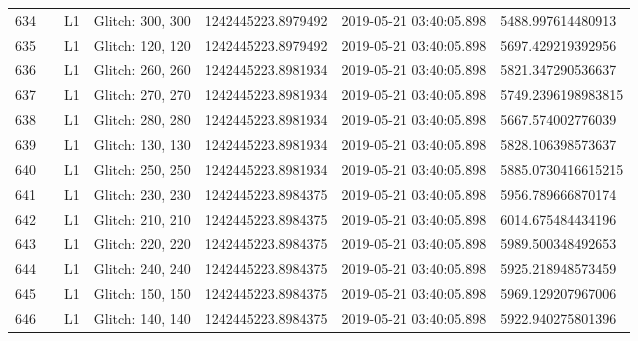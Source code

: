 \begin{longtable}{lllllll}
634  &                                                    &       L1 &  Glitch: 300, 300 &  1242445223.8979492 &  2019-05-21 03:40:05.898 &   5488.997614480913 \\
635  &                                                    &       L1 &  Glitch: 120, 120 &  1242445223.8979492 &  2019-05-21 03:40:05.898 &   5697.429219392956 \\
636  &                                                    &       L1 &  Glitch: 260, 260 &  1242445223.8981934 &  2019-05-21 03:40:05.898 &   5821.347290536637 \\
637  &                                                    &       L1 &  Glitch: 270, 270 &  1242445223.8981934 &  2019-05-21 03:40:05.898 &  5749.2396198983815 \\
638  &                                                    &       L1 &  Glitch: 280, 280 &  1242445223.8981934 &  2019-05-21 03:40:05.898 &   5667.574002776039 \\
639  &                                                    &       L1 &  Glitch: 130, 130 &  1242445223.8981934 &  2019-05-21 03:40:05.898 &   5828.106398573637 \\
640  &                                                    &       L1 &  Glitch: 250, 250 &  1242445223.8981934 &  2019-05-21 03:40:05.898 &  5885.0730416615215 \\
641  &                                                    &       L1 &  Glitch: 230, 230 &  1242445223.8984375 &  2019-05-21 03:40:05.898 &   5956.789666870174 \\
642  &                                                    &       L1 &  Glitch: 210, 210 &  1242445223.8984375 &  2019-05-21 03:40:05.898 &   6014.675484434196 \\
643  &                                                    &       L1 &  Glitch: 220, 220 &  1242445223.8984375 &  2019-05-21 03:40:05.898 &   5989.500348492653 \\
644  &                                                    &       L1 &  Glitch: 240, 240 &  1242445223.8984375 &  2019-05-21 03:40:05.898 &   5925.218948573459 \\
645  &                                                    &       L1 &  Glitch: 150, 150 &  1242445223.8984375 &  2019-05-21 03:40:05.898 &   5969.129207967006 \\
646  &                                                    &       L1 &  Glitch: 140, 140 &  1242445223.8984375 &  2019-05-21 03:40:05.898 &   5922.940275801396 \\

\end{longtable}

